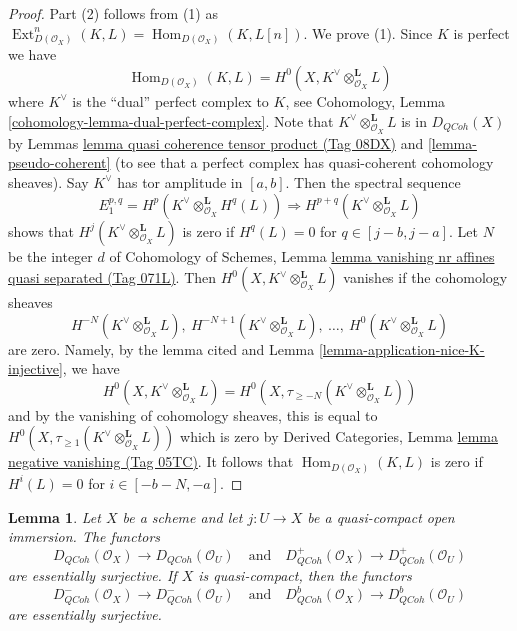 \documentclass{amsart}
\theoremstyle{plain}
\newtheorem{lemma}[subsection]{Lemma}
\theoremstyle{definition}
\theoremstyle{remark}
\numberwithin{equation}{subsection}
\def\Hom{\mathop{\mathrm{Hom}}\nolimits}
\def\Ext{\mathop{\mathrm{Ext}}\nolimits}
\def\QCoh{\mathit{QCoh}}
\begin{document}
\begin{proof}
Part (2) follows from (1) as $\Ext^n_{D(\mathcal{O}_X)}(K, L) =
\Hom_{D(\mathcal{O}_X)}(K, L[n])$. We prove (1).
Since $K$ is perfect we have
$$
\Hom_{D(\mathcal{O}_X)}(K, L) =
H^0(X, K^\vee \otimes_{\mathcal{O}_X}^\mathbf{L} L)
$$
where $K^\vee$ is the ``dual'' perfect complex to $K$, see
Cohomology, Lemma \ref{cohomology-lemma-dual-perfect-complex}.
Note that $K^\vee \otimes_{\mathcal{O}_X}^\mathbf{L} L$
is in $D_\QCoh(X)$ by
Lemmas \href{https://stacks.math.columbia.edu/tag/08DX}{lemma quasi coherence tensor product (Tag 08DX)} and
\ref{lemma-pseudo-coherent} (to see that a perfect complex
has quasi-coherent cohomology sheaves). Say $K^\vee$ has
tor amplitude in $[a, b]$. Then the spectral sequence
$$
E_1^{p, q} = H^p(K^\vee \otimes_{\mathcal{O}_X}^\mathbf{L} H^q(L))
\Rightarrow
H^{p + q}(K^\vee \otimes_{\mathcal{O}_X}^\mathbf{L} L)
$$
shows that $H^j(K^\vee \otimes_{\mathcal{O}_X}^\mathbf{L} L)$
is zero if $H^q(L) = 0$ for $q \in [j - b, j - a]$.
Let $N$ be the integer $d$ of Cohomology of Schemes,
Lemma \href{https://stacks.math.columbia.edu/tag/071L}{lemma vanishing nr affines quasi separated (Tag 071L)}.
Then $H^0(X, K^\vee \otimes_{\mathcal{O}_X}^\mathbf{L} L)$
vanishes if the cohomology sheaves
$$
H^{-N}(K^\vee \otimes_{\mathcal{O}_X}^\mathbf{L} L),
\ H^{-N + 1}(K^\vee \otimes_{\mathcal{O}_X}^\mathbf{L} L),
\ \ldots,
\ H^0(K^\vee \otimes_{\mathcal{O}_X}^\mathbf{L} L)
$$
are zero. Namely, by the lemma cited and
Lemma \ref{lemma-application-nice-K-injective}, we have
$$
H^0(X, K^\vee \otimes_{\mathcal{O}_X}^\mathbf{L} L) =
H^0(X, \tau_{\geq -N}(K^\vee \otimes_{\mathcal{O}_X}^\mathbf{L} L))
$$
and by the vanishing of cohomology sheaves, this is equal to
$H^0(X, \tau_{\geq 1}(K^\vee \otimes_{\mathcal{O}_X}^\mathbf{L} L))$
which is zero by Derived Categories, Lemma
\href{https://stacks.math.columbia.edu/tag/05TC}{lemma negative vanishing (Tag 05TC)}.
It follows that $\Hom_{D(\mathcal{O}_X)}(K, L)$ is zero if
$H^i(L) = 0$ for $i \in [-b - N, -a]$.
\end{proof}


\begin{lemma}
\label{lemma-lift-quasi-coherent}
Let $X$ be a scheme and let $j : U \to X$ be a quasi-compact
open immersion. The functors
$$
D_\QCoh(\mathcal{O}_X) \to D_\QCoh(\mathcal{O}_U)
\quad\text{and}\quad
D^+_\QCoh(\mathcal{O}_X) \to D^+_\QCoh(\mathcal{O}_U)
$$
are essentially surjective. If $X$ is quasi-compact, then the functors
$$
D^-_\QCoh(\mathcal{O}_X) \to D^-_\QCoh(\mathcal{O}_U)
\quad\text{and}\quad
D^b_\QCoh(\mathcal{O}_X) \to D^b_\QCoh(\mathcal{O}_U)
$$
are essentially surjective.
\end{lemma}
\end{document}
